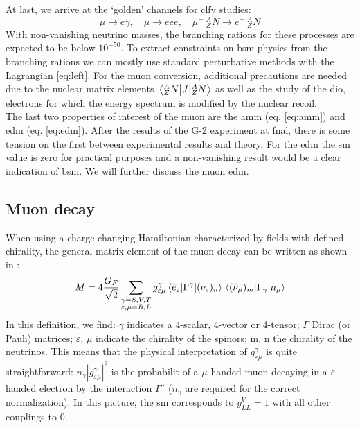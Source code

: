\begin{refsection}
        At last, we arrive at the `golden' channels for \gls{clfv} studies:
        \begin{equation}
            \mu\rightarrow e\gamma, \quad \mu\rightarrow eee, \quad \mu^- \ ^A_ZN\rightarrow e^-\ ^A_ZN
        \end{equation}    
        With non-vanishing neutrino masses, the branching rations for these processes are expected to be below $10^{-50}$.
        To extract constraints on \gls{bsm} physics from the branching rations we can mostly use standard perturbative methods with the Lagrangian \ref{eq:left}.
        For the muon conversion, additional precautions are needed due to the nuclear matrix elements $\matrixel{^A_ZN}{J}{^A_ZN}$ as well as the study of the \gls{dio}, electrons for which the energy spectrum is modified by the nuclear recoil.\\

        \noindent
        The last two properties of interest of the muon are the \gls{amm} (eq. \ref{eq:amm}) and \gls{edm} (eq. \ref{eq:edm}). 
        After the results of the G-2 experiment at \gls{fnal}, there is some tension on the first between experimental results and theory. 
        For the \gls{edm} the \gls{sm} value is zero for practical purposes and a non-vanishing result would be a clear indication of \gls{bsm}.
        We will further discuss the muon \gls{edm}.

    \subsection{Muon decay}
        When using a charge-changing Hamiltonian characterized by fields with defined chirality, the general matrix element of the muon decay can be written as shown in \cite{muondecay:matrix}:
        \begin{equation}
            M=4\frac{G_F}{\sqrt{2}}\sum_{\substack{ \gamma = S,V,T \\ \varepsilon,\mu = R,L}}g^\gamma_{\varepsilon\mu} \matrixel{\bar{e}_\varepsilon}{\Gamma^\gamma}{(\nu_e)_n} \matrixel{(\bar{\nu}_\mu)_m}{\Gamma_\gamma}{\mu_\mu}
        \end{equation}
        In this definition, we find: $\gamma$ indicates a 4-scalar, 4-vector or 4-tensor; $\Gamma$ Dirac (or Pauli) matrices; $\varepsilon$, $\mu$ indicate the chirality of the spinors; m, n the chirality of the neutrinos.
        This means that the physical interpretation of $g^\gamma_{\varepsilon\mu}$ is quite straightforward: $n_\gamma|g^\gamma_{\varepsilon\mu}|^2$ is the probabilit of a $\mu$-handed muon decaying in a $\varepsilon$-handed electron by the interaction $\Gamma^\gamma$ ($n_\gamma$ are required for the correct normalization).
        In this picture, the \gls{sm} corresponds to $g_{LL}^V=1$ with all other couplings to 0.
        

\end{refsection}
